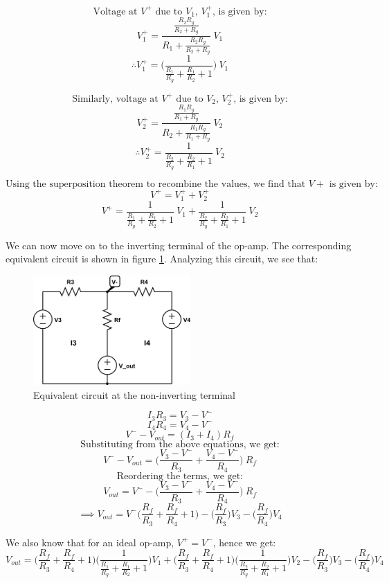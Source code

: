 \documentclass{article}
\theoremstyle{plain}
\theoremstyle{definition}
\theoremstyle{remark}
\begin{document}
$$\text{Voltage at $V^+$ due to $V_1$, $V^+_1$, is given by:}$$
$$V^+_1 = \frac{\frac{R_2 R_g}{R_2+R_g}}{R_1 + \frac{R_2 R_g}{R_2+R_g}}\ V_1$$
$$\therefore V^+_1 = \Big(\frac{1}{\frac{R_1}{R_g} + \frac{R_1}{R_2} + 1}\Big) \ V_1$$

$$\text{Similarly, voltage at $V^+$ due to $V_2$, $V^+_2$, is given by:}$$
$$V^+_2 = \frac{\frac{R_1 R_g}{R_1+R_g}}{R_2 + \frac{R_1 R_g}{R_1+R_g}}\ V_2$$
$$\therefore  V^+_2 = \frac{1}{\frac{R_2}{R_g} + \frac{R_2}{R_1} + 1} \ V_2$$

$$\text{Using the superposition theorem to recombine the values, we find that $V+$ is given by:}$$
$$V^+ = V^+_1 + V^+_2 $$
$$V^+ = \frac{1}{\frac{R_1}{R_g} + \frac{R_1}{R_2} + 1} \ V_1 + \frac{1}{\frac{R_2}{R_g} + \frac{R_2}{R_1} + 1} \ V_2 $$

We can now move on to the inverting terminal of the op-amp. The corresponding equivalent circuit is shown in figure \ref{q2_b2}.  Analyzing this circuit, we see that:
\begin{figure}[h]
\begin{center}
\includegraphics[width=6cm]{lab1_q2_kvl2.png}
\end{center}
\caption{Equivalent circuit at the non-inverting terminal}
\label{q2_b2}
\end{figure}
$$I_3R_3 = V_3 - V^-$$
$$I_4R_4 = V_4 - V^-$$
$$V^- - V_{out} = (I_3 + I_4)R_f $$
$$\text{Substituting from the above equations, we get:}$$
$$ V^- - V_{out} = \Big( \frac{ V_3 - V^-}{R_3} + \frac{ V_4 - V^-}{R_4}\Big) \ R_f$$
$$\text{Reordering the terms, we get:}$$
$$V_{out} =V^- -  \Big( \frac{ V_3 - V^-}{R_3} + \frac{ V_4 - V^-}{R_4}\Big) \ R_f $$
$$\implies V_{out} =V^- \Big( \frac{R_f}{R_3} + \frac{ R_f}{R_4} + 1\Big) - \Big( \frac{R_f}{R_3}\Big)V_3 - \Big( \frac{ R_f}{R_4}\Big)V_4$$

We also know that for an ideal op-amp, $V^+ = V^-$, hence we get:
$$ V_{out} = \Big( \frac{R_f}{R_3} + \frac{ R_f}{R_4} + 1\Big) \Big( \frac{1}{\frac{R_1}{R_g} + \frac{R_1}{R_2} + 1}\Big) V_1 + \Big( \frac{R_f}{R_3} + \frac{ R_f}{R_4} + 1\Big) \Big( \frac{1}{\frac{R_2}{R_g} + \frac{R_2}{R_1} + 1} \Big) V_2 - \Big( \frac{R_f}{R_3}\Big)V_3 - \Big( \frac{ R_f}{R_4}\Big)V_4$$
\end{document}
